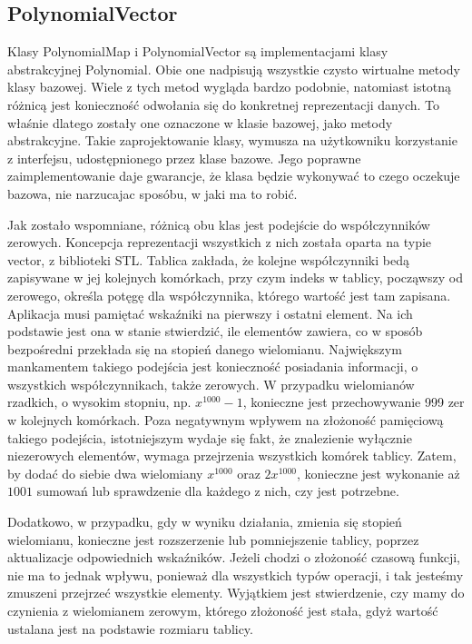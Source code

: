\documentclass[twoside,a4paper]{book}
\begin{document}
\subsection{PolynomialVector}

Klasy PolynomialMap i PolynomialVector są implementacjami klasy abstrakcyjnej Polynomial. Obie one nadpisują wszystkie czysto wirtualne metody klasy bazowej. Wiele z tych metod wygląda bardzo podobnie, natomiast istotną różnicą jest konieczność odwołania się do konkretnej reprezentacji danych. To właśnie dlatego zostały one oznaczone w klasie bazowej, jako metody abstrakcyjne. Takie zaprojektowanie klasy, wymusza na użytkowniku korzystanie z interfejsu, udostępnionego przez klase bazowe. Jego poprawne zaimplementowanie daje gwarancje, że klasa będzie wykonywać to czego oczekuje bazowa, nie narzucajac sposóbu, w jaki ma to robić.

Jak zostało wspomniane, różnicą obu klas jest podejście do współczynników zerowych. Koncepcja reprezentacji wszystkich z nich została oparta na typie vector, z biblioteki STL. Tablica zakłada, że kolejne współczynniki bedą zapisywane w jej kolejnych komórkach, przy czym indeks w tablicy, począwszy od zerowego, określa potęgę dla współczynnika, którego wartość jest tam zapisana. Aplikacja musi pamiętać wskaźniki na pierwszy i ostatni element. Na ich podstawie jest ona w stanie stwierdzić, ile elementów zawiera, co w sposób bezpośredni przekłada się na stopień danego wielomianu. Największym mankamentem takiego podejścia jest konieczność posiadania informacji, o wszystkich współczynnikach, także zerowych. W przypadku wielomianów rzadkich, o wysokim stopniu, np. $x^{1000}-1$, konieczne jest przechowywanie 999 zer w kolejnych komórkach. Poza negatywnym wpływem na złożoność pamięciową takiego podejścia, istotniejszym wydaje się fakt, że znalezienie wyłącznie niezerowych elementów, wymaga przejrzenia wszystkich komórek tablicy. Zatem, by dodać do siebie dwa wielomiany $x^{1000}$ oraz $2x^{1000}$, konieczne jest wykonanie aż $1001$ sumowań lub sprawdzenie dla każdego z nich, czy jest potrzebne.

Dodatkowo, w przypadku, gdy w wyniku działania, zmienia się stopień wielomianu, konieczne jest rozszerzenie lub pomniejszenie tablicy, poprzez aktualizacje odpowiednich wskaźników. Jeżeli chodzi o złożoność czasową funkcji, nie ma to jednak wpływu, ponieważ dla wszystkich typów operacji, i tak jesteśmy zmuszeni przejrzeć wszystkie elementy. Wyjątkiem jest stwierdzenie, czy mamy do czynienia z wielomianem zerowym, którego złożoność jest stała, gdyż wartość ustalana jest na podstawie rozmiaru tablicy.
\end{document}
